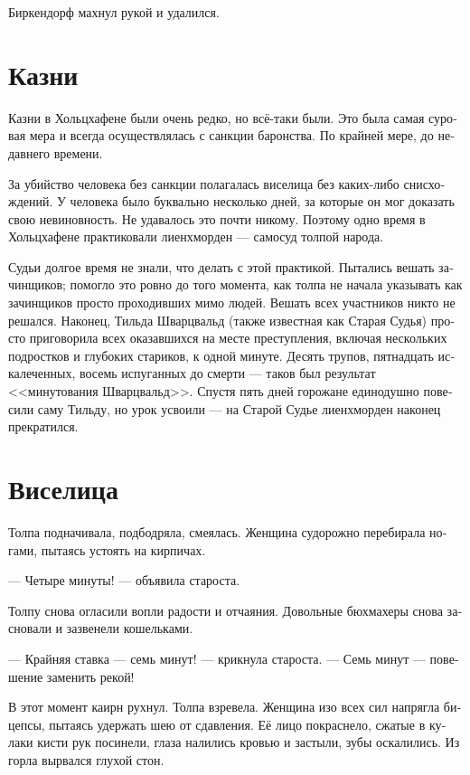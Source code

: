 \documentclass[a4paper,12pt,fleqn]{book}\usepackage{polyglossia}\setdefaultlanguage[babelshorthands=true]{russian}\setotherlanguage{english}\defaultfontfeatures{Ligatures=TeX,Mapping=tex-text}\usepackage{xcolor}\newcommand{\ml}[3]{#2}
\begin{document}
Биркендорф махнул рукой и удалился.

\section{Казни}

Казни в Хольцхафене были очень редко, но всё-таки были.
Это была самая суровая мера и всегда осуществлялась с санкции баронства.
По крайней мере, до недавнего времени.

За убийство человека без санкции полагалась виселица без каких-либо снисхождений.
У человека было буквально несколько дней, за которые он мог доказать свою невиновность.
Не удавалось это почти никому.
Поэтому одно время в Хольцхафене практиковали лиенхморден --- самосуд толпой народа.

Судьи долгое время не знали, что делать с этой практикой.
Пытались вешать зачинщиков;
помогло это ровно до того момента, как толпа не начала указывать как зачинщиков просто проходивших мимо людей.
Вешать всех участников никто не решался.
Наконец, Тильда Шварцвальд (также известная как Старая Судья) просто приговорила всех оказавшихся на месте преступления, включая нескольких подростков и глубоких стариков, к одной минуте.
\ml{$0$}
{Десять трупов, пятнадцать искалеченных, восемь испуганных до смерти --- таков был результат <<минутования Шварцвальд>>.}
{Ten dead, fifteen crippled, eight scared to death---that's how the Schwarzwald's Minute ended.}
\ml{$0$}
{Спустя пять дней горожане единодушно повесили саму Тильду, но урок усвоили --- на Старой Судье лиенхморден наконец прекратился.}
{Five days later burgers unanimously hung Tilda herself, but they've learned the lesson: after a step over the Old Judge leenchmorden has finally stopped.}

\section{Виселица}

Толпа подначивала, подбодряла, смеялась.
Женщина судорожно перебирала ногами, пытаясь устоять на кирпичах.

--- Четыре минуты! --- объявила староста.

Толпу снова огласили вопли радости и отчаяния.
Довольные бюхмахеры снова засновали и зазвенели кошельками.

--- Крайняя ставка --- семь минут! --- крикнула староста.
--- Семь минут --- повешение заменить рекой!

В этот момент каирн рухнул.
Толпа взревела.
Женщина изо всех сил напрягла бицепсы, пытаясь удержать шею от сдавления.
Её лицо покраснело, сжатые в кулаки кисти рук посинели, глаза налились кровью и застыли, зубы оскалились.
Из горла вырвался глухой стон.
\end{document}
